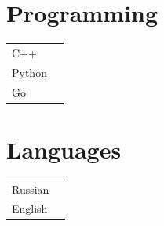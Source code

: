\documentclass[a4paper,10pt]{article}
\begin{document}
\begin{adjustbox}{valign=t}
\begin{minipage}{0.6\textwidth}
\begin{multicols}{2}
\section*{Programming}
\begin{tabular}{ll}
	C++  			& \SkillBull{$\bullet \bullet \bullet$}\\
	Python 		& \SkillBull{$\bullet \bullet \bullet$}\\
	Go 	& \SkillBull{$\bullet \bullet \circ $}\\
\end{tabular}

\vfill\null \columnbreak  %

\section*{Languages}
\begin{tabular}{ll}
	Russian 		& \SkillBull{$\bullet \bullet \bullet$}\\
	English 		& \SkillBull{$\bullet \bullet \circ$}\\
\end{tabular}
\end{multicols}
\LastUpdate
\end{minipage}
\end{adjustbox}
\end{document}
